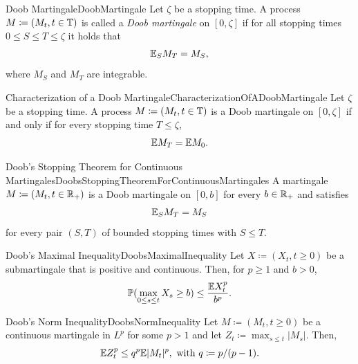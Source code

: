 \begin{defn}{Doob Martingale}{DoobMartingale}
	Let \(\zeta\) be a stopping time. A process \(M \coloneqq (M_t, t \in \mathbb{T})\) is called a \emph{Doob martingale} on \([0, \zeta]\) if for all stopping times \(0 \le S \le T \le \zeta\) it holds that
	\begin{equation}\label{eq:DoobMartingaleCondition}
		\mathbb{E}_S M_T = M_S,
	\end{equation}
	where \(M_S\) and \(M_T\) are integrable.
\end{defn}

\begin{thm}{Characterization of a Doob Martingale}{CharacterizationOfADoobMartingale}
	Let \(\zeta\) be a stopping time. A process \(M \coloneqq (M_t, t \in \mathbb{T})\) is a Doob martingale on \([0, \zeta]\) if and only if for every stopping time \(T \le \zeta\),
	\begin{equation}\label{eq:DoobMartingaleExpectation}
		\mathbb{E} M_T = \mathbb{E} M_0.
	\end{equation}
\end{thm}

\begin{thm}{Doob's Stopping Theorem for Continuous Martingales}{DoobsStoppingTheoremForContinuousMartingales}
	A martingale \(M \coloneqq (M_t, t \in \mathbb{R}_+)\) is a Doob martingale on \([0, b]\) for every \(b \in \mathbb{R}_+\) and satisfies
	\begin{equation}\label{eq:DoobStoppingContinuous}
		\mathbb{E}_S M_T = M_S
	\end{equation}
	for every pair \((S, T)\) of bounded stopping times with \(S \le T\).
\end{thm}

\begin{prop}{Doob's Maximal Inequality}{DoobsMaximalInequality}
	Let \(X \coloneqq (X_t, t \ge 0)\) be a submartingale that is positive and continuous. Then, for \(p \ge 1\) and \(b > 0\),
	\begin{equation}\label{eq:DoobsMaximalInequality}
		\mathbb{P}(\max_{0 \le s \le t} X_s \ge b) \le \frac{\mathbb{E} X_t^p}{b^p}.
	\end{equation}
\end{prop}

\begin{prop}{Doob's Norm Inequality}{DoobsNormInequality}
	Let \(M \coloneqq (M_t, t \ge 0)\) be a continuous martingale in \(L^p\) for some \(p > 1\) and let \(Z_t \coloneqq \max_{s \le t} \lvert M_s \rvert\). Then,
	\begin{equation}\label{eq:DoobsNormInequality}
		\mathbb{E} Z_t^p \le q^p \mathbb{E} \lvert M_t \rvert^p, \text{ with } q \coloneqq p/(p-1).
	\end{equation}
\end{prop}

